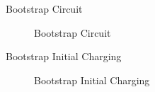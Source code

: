 
\begin{frame}{Bootstrap Circuit}
	\begin{figure}
		\centering


		\caption{Bootstrap Circuit}
	\end{figure}
\end{frame}



\begin{frame}{Bootstrap Initial Charging}
	\begin{figure}
		\centering


		\caption{Bootstrap Initial Charging}
	\end{figure}
\end{frame}


